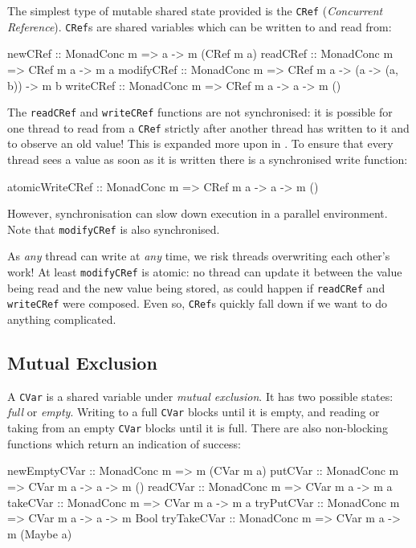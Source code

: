 The simplest type of mutable shared state provided is the \verb|CRef|
(\emph{Concurrent Reference}). \verb|CRef|s are shared variables which
can be written to and read from:

\begin{haskellcode}
newCRef    :: MonadConc m => a -> m (CRef m a)
readCRef   :: MonadConc m => CRef m a -> m a
modifyCRef :: MonadConc m => CRef m a -> (a -> (a, b)) -> m b
writeCRef  :: MonadConc m => CRef m a -> a -> m ()
\end{haskellcode}

The \verb|readCRef| and \verb|writeCRef| functions are not
synchronised: it is possible for one thread to read from a \verb|CRef|
strictly after another thread has written to it and to observe an old
value!  This is expanded more upon in . To
ensure that every thread sees a value as soon as it is written there
is a synchronised write function:

\begin{haskellcode}
atomicWriteCRef :: MonadConc m => CRef m a -> a -> m ()
\end{haskellcode}

However, synchronisation can slow down execution in a parallel
environment. Note that \verb|modifyCRef| is also synchronised.

As \emph{any} thread can write at \emph{any} time, we risk threads
overwriting each other's work! At least \verb|modifyCRef| is atomic:
no thread can update it between the value being read and the new value
being stored, as could happen if \verb|readCRef| and \verb|writeCRef|
were composed. Even so, \verb|CRef|s quickly fall down if we want to
do anything complicated.

\subsection{Mutual Exclusion}
\label{sec:abstraction-typeclass-cvars}

A \verb|CVar| is a shared variable under \emph{mutual exclusion}. It
has two possible states: \emph{full} or \emph{empty}. Writing to a
full \verb|CVar| blocks until it is empty, and reading or taking from
an empty \verb|CVar| blocks until it is full. There are also
non-blocking functions which return an indication of success:

\begin{haskellcode}
newEmptyCVar :: MonadConc m => m (CVar m a)
putCVar      :: MonadConc m => CVar m a -> a -> m ()
readCVar     :: MonadConc m => CVar m a -> m a
takeCVar     :: MonadConc m => CVar m a -> m a
tryPutCVar   :: MonadConc m => CVar m a -> a -> m Bool
tryTakeCVar  :: MonadConc m => CVar m a -> m (Maybe a)
\end{haskellcode}

